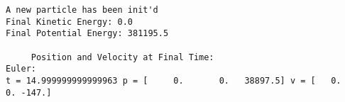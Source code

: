 \documentclass[11pt]{article}
\begin{document}
    \begin{Verbatim}[commandchars=\\\{\}]
A new particle has been init'd
Final Kinetic Energy: 0.0
Final Potential Energy: 381195.5

	 Position and Velocity at Final Time:
Euler:
t = 14.999999999999963 p = [     0.       0.   38897.5] v = [   0.    0. -147.]

    \end{Verbatim}

    \begin{center}
    \end{center}
    { \hspace*{\fill} \\}
    
    \begin{center}
    \end{center}
    { \hspace*{\fill} \\}
    
    \begin{center}
    \end{center}
    { \hspace*{\fill} \\}
    
\end{document}

